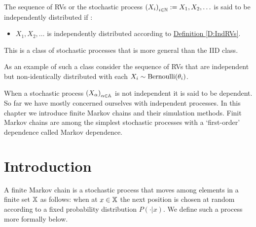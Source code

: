{\begin{definition}
The sequence of RVs or the stochastic process $\left(X_i\right)_{i \in \mathbb{N}} := X_1, X_2,\ldots$ is said to be independently distributed if :
\begin{itemize}
\item $X_1, X_2,\ldots$ is independently distributed according to \hyperref[D:IndRVs]{Definition \ref*{D:IndRVs}}.
\end{itemize}
This is a class of stochastic processes that is more general than the IID class.
\end{definition}

As an example of such a class consider the sequence of RVs that are independent but non-identically distributed with each $X_i \sim \mbox{{\rm Bernoulli}}(\theta_i)$.

When a stochastic process $\left(X_{\alpha} \right)_{\alpha \in \mathbb{A}}$ is not independent it is said to be dependent.  
So far we have mostly concerned ourselves with independent processes.  
In this chapter we introduce finite Markov chains and their  simulation methods.
Finit Markov chains are among the simplest stochastic processes with a `first-order' dependence called Markov dependence.

\section{Introduction}\label{S:FiniteMCIntro}
A finite Markov chain is a stochastic process that moves among elements in a finite set $\mathbb{X}$ as follows: when at $x \in \mathbb{X}$ the next position is chosen at random according to a fixed probability distribution $P(\cdot | x)$.  We define such a process more formally below.

}
